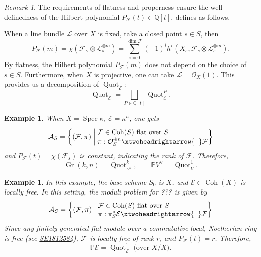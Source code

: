 \documentclass[UTF8]{amsart}
\numberwithin{equation}{section}
\theoremstyle{plain}
\newtheorem{eg}[theorem]{Example}
\numberwithin{equation}{section}
\theoremstyle{remark}
\newtheorem{remark}[theorem]{Remark}
\DeclareMathOperator{\Gr}{\operatorname{Gr}}
\DeclareMathOperator{\Spec}{\operatorname{Spec}}
\DeclareMathOperator{\Coh}{\operatorname{Coh}}
\DeclareMathOperator{\Quot}{\operatorname{Quot}}
\begin{document}
\begin{remark}
The requirements of flatness and properness ensure the well-definedness of the Hilbert polynomial $P_{\mathcal{F}}(t) \in \mathbb{Q}[t]$, defines as follows.

When a line bundle $\mathcal{L}$ over $X$ is fixed, take a closed point $s \in S$, then 
$$P_{\mathcal{F}}(m) = \chi(\mathcal{F}_s \otimes \mathcal{L}_s^{\otimes m}) = \sum_{i=0}^{\dim \mathcal{F}} (-1)^i h^i (X_s, \mathcal{F}_s \otimes \mathcal{L}_s^{\otimes m}).$$
 By flatness,  the Hilbert polynomial $P_{\mathcal{F}}(m)$ does not depend on the choice of $s \in S$. Furthermore, when $X$ is projective, one can take $\mathcal{L} = \mathcal{O}_X(1)$. This provides us a decomposition of $\Quot_{\mathcal{E}}$:
 $$\Quot_{\mathcal{E}} = \bigsqcup_{P \in \mathbb{Q}[t]} \Quot_{\mathcal{E}}^P.$$
\end{remark}

\begin{eg}
When $X= \Spec \kappa$, $\mathcal{E}= \kappa^n$, one gets
$$\mathcal{A}_S=\left\{(\mathcal{F},\pi)  \;\middle|\; \begin{aligned}
&\\[-5mm]
&\mathcal{F} \in \Coh(S) \text{ flat over $S$ }\\[-1mm]
& \pi:\mathcal{O}_S^{\oplus n} \xtwoheadrightarrow{\hspace{2mm}}  \mathcal{F}
\end{aligned}
 \right\}$$
 and $P_{\mathcal{F}}(t)= \chi (\mathcal{F}_s)$ is constant, indicating the rank of $\mathcal{F}$. Therefore,
 $$\Gr(k,n) = \Quot_{\kappa^n}^{k}, \qquad \mathbb{P}V^{\vee}= \Quot_V^{1}.$$
\end{eg}

\begin{eg}
In this example, the base scheme $S_0$ is $X$, and $\mathcal{E} \in \Coh(X)$ is locally free. In this setting, the moduli problem for ??? is given by
$$\mathcal{A}_S=\left\{(\mathcal{F},\pi)  \;\middle|\; \begin{aligned}
&\\[-5mm]
&\mathcal{F} \in \Coh(S) \text{ flat over $S$ }\\[-1mm]
& \pi:\pi_S^*\mathcal{E} \xtwoheadrightarrow{\hspace{2mm}}  \mathcal{F}
\end{aligned}
 \right\}$$
 Since any finitely generated flat module over a commutative local, Noetherian ring is free (see \href{https://math.stackexchange.com/questions/1812584/finitely-generated-flat-modules-over-a-commutative-local-noetherian-ring-are-f}{SE1812584}),
 $\mathcal{F}$ is locally free of rank $r$, and $P_{\mathcal{F}}(t)=r$. Therefore,
 $$\mathbb{P}\mathcal{E} = \Quot_{\mathcal{E}}^{1} \text{ (over $X/X$)}.$$
\end{eg}
\end{document}
